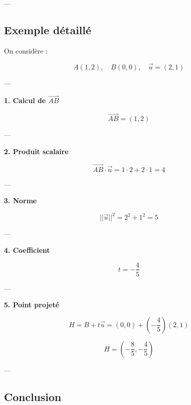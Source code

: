 \documentclass[11pt,a4paper]{article}
\begin{document}
\begin{center}
\end{center}

---

\subsection{Exemple détaillé}

On considère :

\[
A(1,2), \quad B(0,0), \quad \vec{u} = (2,1)
\]

---

\textbf{1. Calcul de $\vec{AB}$}

\[
\vec{AB} = (1,2)
\]

---

\textbf{2. Produit scalaire}

\[
\vec{AB} \cdot \vec{u} = 1 \cdot 2 + 2 \cdot 1 = 4
\]

---

\textbf{3. Norme}

\[
||\vec{u}||^2 = 2^2 + 1^2 = 5
\]

---

\textbf{4. Coefficient}

\[
t = -\frac{4}{5}
\]

---

\textbf{5. Point projeté}

\[
H = B + t\vec{u}
= (0,0) + \left(-\frac{4}{5}\right)(2,1)
\]

\[
\boxed{
H = \left(-\frac{8}{5}, -\frac{4}{5}\right)
}
\]

---

\subsection{Conclusion}
\end{document}
